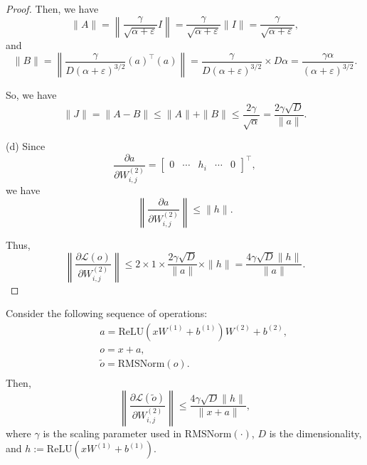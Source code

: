 \begin{proof}
Then, we have
\begin{equation}
    \|A\| = \left\|\frac{\gamma}{\sqrt{\alpha + \varepsilon}} I \right\| 
    = \frac{\gamma}{\sqrt{\alpha + \varepsilon}} \|I\| 
    = \frac{\gamma}{\sqrt{\alpha + \varepsilon}},
\end{equation}
and
\begin{equation}
    \|B\| = \left\|\frac{\gamma}{D(\alpha + \varepsilon)^{3/2}} \left(a\right)^\top \left(a\right)\right\| 
    = \frac{\gamma}{D(\alpha + \varepsilon)^{3/2}} \times D\alpha 
    = \frac{\gamma \alpha}{(\alpha + \varepsilon)^{3/2}}.
\end{equation}

So, we have
\begin{equation}
    \| J \| = \| A - B \| \leq \| A \| + \| B \| \leq \frac{2\gamma}{\sqrt{\alpha}} = \frac{2\gamma \sqrt{D}}{\|a\|}.
\end{equation}

(d) Since
\begin{equation}
    \frac{\partial a}{\partial W_{i,j}^{(2)}} =
    \begin{bmatrix}
    0 & \cdots & h_{i} & \cdots & 0
    \end{bmatrix}^\top,
\end{equation}
we have
\begin{equation}
    \left\| \frac{\partial a}{\partial W_{i,j}^{(2)}} \right\| \leq \| h \|.
\end{equation}

Thus,
\begin{equation}
    \left\| \frac{\partial \mathcal{L}(o)}{\partial W_{i,j}^{(2)}} \right\| \leq 2 \times 1 \times \frac{2\gamma \sqrt{D}}{\|a\|} \times \| h \| = \frac{4\gamma \sqrt{D} \| h \|}{\|a\|}.
\end{equation}

\end{proof}


\begin{proposition}
Consider the following sequence of operations:
\begin{align*}
    & \quad a = \mathrm{ReLU}(x W^{(1)} + b^{(1)})W^{(2)} + b^{(2)}, \\
    & \quad o = x + a, \\
    & \quad \tilde{o} = \mathrm{RMSNorm}(o). \\
\end{align*}
Then,
\begin{equation}
    \left\lVert \frac{\partial \mathcal{L}(\tilde{o})}{\partial W_{i,j}^{(2)}} \right\rVert 
\leq  
\frac{4\gamma \sqrt{D} \| h \|}{\|x + a\|}, 
\end{equation}
where $\gamma$ is the scaling parameter used in $\mathrm{RMSNorm}(\cdot)$, $D$ is the dimensionality, and $h := \mathrm{ReLU}\left(x W^{(1)} + b^{(1)}\right)$.
\end{proposition}

